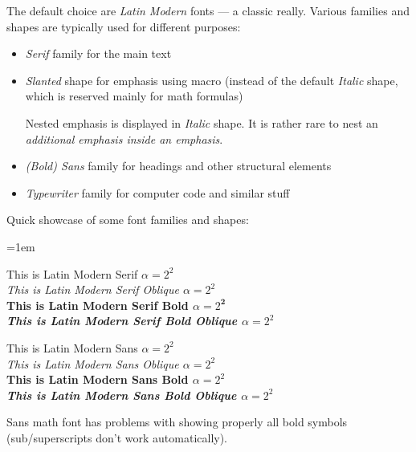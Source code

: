 The default choice are \emph{Latin Modern} fonts --- a classic really.
Various families and shapes are typically used for different purposes:
\begin{itemize}
    \item \emph{Serif} family for the main text
    \item \emph{Slanted} shape for emphasis using \macro{\emph} macro (instead of the default \emph{Italic} shape, which is reserved mainly for math formulas)
          \begin{remark}
              Nested emphasis is displayed in \emph{Italic} shape.
              It is rather rare to nest an \emph{additional \emph{emphasis} inside an emphasis}.
          \end{remark}
    \item \emph{(Bold) Sans} family for headings and other structural elements
    \item \emph{Typewriter} family for computer code and similar stuff
\end{itemize}
\vspace{1ex}

\begin{example}
    Quick showcase of some font families and shapes:\par \leftskip=1em

    {                  This is Latin Modern Serif \(\alpha = 2^{2}\)}\\
    {\slshape          This is Latin Modern Serif Oblique \(\alpha = 2^{2}\)}\\
    {\bfseries         This is Latin Modern Serif Bold \(\alpha = 2^{\bm{{2}}}\)}\\
    {\bfseries\slshape This is Latin Modern Serif Bold Oblique \(\alpha = 2^{2}\)}

    {\sffamily                  This is Latin Modern Sans \(\alpha = 2^{2}\)}\\
    {\sffamily\slshape          This is Latin Modern Sans Oblique \(\alpha = 2^{2}\)}\\
    {\sffamily\bfseries         This is Latin Modern Sans Bold \(\alpha = 2^{2}\)}\\
    {\sffamily\bfseries\slshape This is Latin Modern Sans Bold Oblique \(\alpha = 2^{2}\)}
\end{example}
\begin{Note}
    Sans math font has problems with showing properly all bold symbols (sub/superscripts don't work automatically).
\end{Note}

